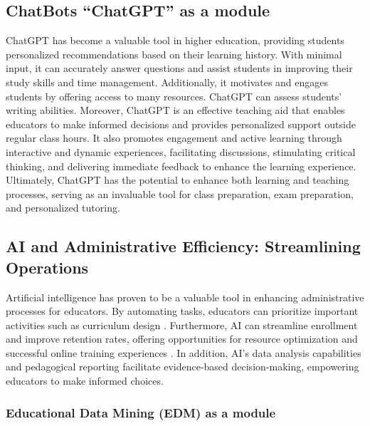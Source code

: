 \subsection{ChatBots ``ChatGPT'' as a module}

ChatGPT has become a valuable tool in higher education, providing students personalized recommendations
based on their learning history. With minimal input, it can accurately answer questions and assist students
in improving their study skills and time management. Additionally, it motivates and engages students by
offering access to many resources. ChatGPT can assess students' writing abilities\citep{mohammed_exploring_2023}.
Moreover, ChatGPT is an effective teaching aid that enables educators to make informed decisions and provides
personalized support outside regular class hours. It also promotes engagement and active learning through interactive
and dynamic experiences, facilitating discussions, stimulating critical thinking, and delivering immediate feedback
to enhance the learning experience\citep{schonberger_chatgpt_2023}.
Ultimately, ChatGPT has the potential to enhance both learning and teaching processes,
serving as an invaluable tool for class preparation, exam preparation, and personalized tutoring\citep{domenech_chatgpt_2023}.



\subsection{AI and Administrative Efficiency: Streamlining Operations}
Artificial intelligence has proven to be a valuable tool in enhancing administrative processes for educators.
By automating tasks, educators can prioritize important activities such as curriculum design \citep{drach_use_2023}.
Furthermore, AI can streamline enrollment and improve retention rates, offering opportunities for resource optimization
and successful online training experiences \citep{lukianets_promises_2023}. In addition, AI's data analysis capabilities
and pedagogical reporting facilitate evidence-based decision-making, empowering educators to make informed choices\citep{guerrero-quinonez_artificial_2023}.

\subsubsection{Educational Data Mining (EDM) as a module}

